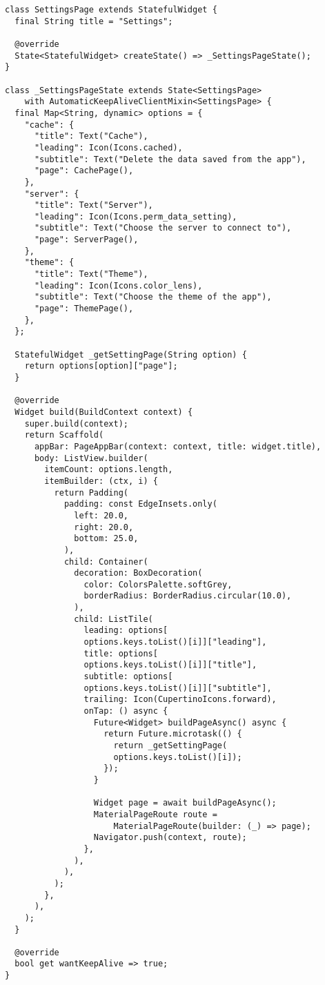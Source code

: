 \begin{lstlisting}
class SettingsPage extends StatefulWidget {
  final String title = "Settings";

  @override
  State<StatefulWidget> createState() => _SettingsPageState();
}

class _SettingsPageState extends State<SettingsPage>
    with AutomaticKeepAliveClientMixin<SettingsPage> {
  final Map<String, dynamic> options = {
    "cache": {
      "title": Text("Cache"),
      "leading": Icon(Icons.cached),
      "subtitle": Text("Delete the data saved from the app"),
      "page": CachePage(),
    },
    "server": {
      "title": Text("Server"),
      "leading": Icon(Icons.perm_data_setting),
      "subtitle": Text("Choose the server to connect to"),
      "page": ServerPage(),
    },
    "theme": {
      "title": Text("Theme"),
      "leading": Icon(Icons.color_lens),
      "subtitle": Text("Choose the theme of the app"),
      "page": ThemePage(),
    },
  };

  StatefulWidget _getSettingPage(String option) {
    return options[option]["page"];
  }

  @override
  Widget build(BuildContext context) {
    super.build(context);
    return Scaffold(
      appBar: PageAppBar(context: context, title: widget.title),
      body: ListView.builder(
        itemCount: options.length,
        itemBuilder: (ctx, i) {
          return Padding(
            padding: const EdgeInsets.only(
              left: 20.0,
              right: 20.0,
              bottom: 25.0,
            ),
            child: Container(
              decoration: BoxDecoration(
                color: ColorsPalette.softGrey,
                borderRadius: BorderRadius.circular(10.0),
              ),
              child: ListTile(
                leading: options[
                options.keys.toList()[i]]["leading"],
                title: options[
                options.keys.toList()[i]]["title"],
                subtitle: options[
                options.keys.toList()[i]]["subtitle"],
                trailing: Icon(CupertinoIcons.forward),
                onTap: () async {
                  Future<Widget> buildPageAsync() async {
                    return Future.microtask(() {
                      return _getSettingPage(
                      options.keys.toList()[i]);
                    });
                  }

                  Widget page = await buildPageAsync();
                  MaterialPageRoute route =
                      MaterialPageRoute(builder: (_) => page);
                  Navigator.push(context, route);
                },
              ),
            ),
          );
        },
      ),
    );
  }

  @override
  bool get wantKeepAlive => true;
}
\end{lstlisting}

